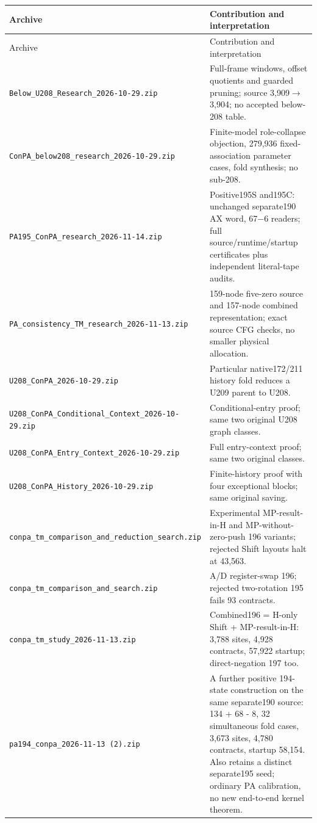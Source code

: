 \small
\begin{longtable}{@{}p{}p{}@{}}
\toprule
Archive & Contribution and interpretation \\
\midrule
\endfirsthead
\toprule
Archive & Contribution and interpretation \\
\midrule
\endhead
\bottomrule
\endfoot
\nolinkurl{Below_U208_Research_2026-10-29.zip} & Full-frame windows, offset quotients and guarded pruning; source 3,909$\to$3,904; no accepted below-208 table. \\[4pt]
\nolinkurl{ConPA_below208_research_2026-10-29.zip} & Finite-model role-collapse objection, 279,936 fixed-association parameter cases, fold synthesis; no sub-208. \\[4pt]
\nolinkurl{PA195_ConPA_research_2026-11-14.zip} & Positive195S and195C: unchanged separate190 AX word, 67$-$6 readers; full source/runtime/startup certificates plus independent literal-tape audits. \\[4pt]
\nolinkurl{PA_consistency_TM_research_2026-11-13.zip} & 159-node five-zero source and 157-node combined representation; exact source CFG checks, no smaller physical allocation. \\[4pt]
\nolinkurl{U208_ConPA_2026-10-29.zip} & Particular native172/211 history fold reduces a U209 parent to U208. \\[4pt]
\nolinkurl{U208_ConPA_Conditional_Context_2026-10-29.zip} & Conditional-entry proof; same two original U208 graph classes. \\[4pt]
\nolinkurl{U208_ConPA_Entry_Context_2026-10-29.zip} & Full entry-context proof; same two original classes. \\[4pt]
\nolinkurl{U208_ConPA_History_2026-10-29.zip} & Finite-history proof with four exceptional blocks; same original saving. \\[4pt]
\nolinkurl{conpa_tm_comparison_and_reduction_search.zip} & Experimental MP-result-in-H and MP-without-zero-push 196 variants; rejected Shift layouts halt at 43,563. \\[4pt]
\nolinkurl{conpa_tm_comparison_and_search.zip} & A/D register-swap 196; rejected two-rotation 195 fails 93 contracts. \\[4pt]
\nolinkurl{conpa_tm_study_2026-11-13.zip} & Combined196 = H-only Shift + MP-result-in-H: 3,788 sites, 4,928 contracts, 57,922 startup; direct-negation 197 too. \\[4pt]
\nolinkurl{pa194_conpa_2026-11-13 (2).zip} & A further positive 194-state construction on the same separate190 source: 134 + 68 - 8, 32 simultaneous fold cases, 3,673 sites, 4,780 contracts, startup 58,154. Also retains a distinct separate195 seed; ordinary PA calibration, no new end-to-end kernel theorem. \\[4pt]

\end{longtable}
